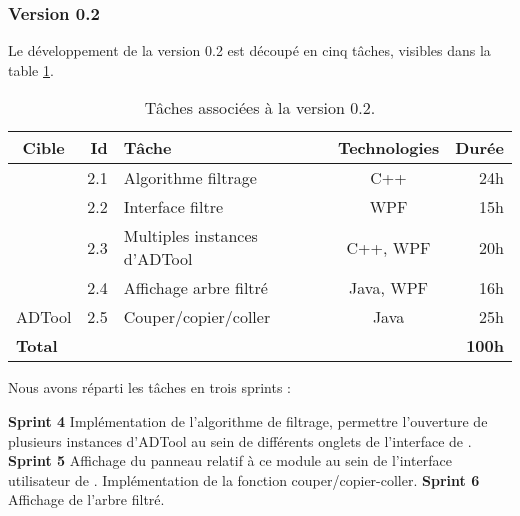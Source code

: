 		\subsubsection{Version 0.2}
			Le développement de la version 0.2 est découpé en cinq tâches, visibles dans la {\sc table} \ref{tab:taches_units_2}.
			\begin{table}[h]
				\centering
				\begin{tabular}{|c|r|l|c|r|}
					\hline
					\textbf{Cible} & \textbf{Id} & \textbf{Tâche} & \textbf{Technologies} & \textbf{Durée}\\
					\hline

					\multirow{4}{*}{\glasir{}} & 2.1 & Algorithme filtrage & C++ & 24h\\
					\cline{2-5}
					 & 2.2 & Interface filtre & WPF & 15h\\
					\cline{2-5}
					 & 2.3 & Multiples instances d'ADTool & C++, WPF & 20h\\
					\cline{2-5}
					 & 2.4 & Affichage arbre filtré & Java, WPF & 16h\\
					\hline

					\multirow{1}{*}{ADTool} & 2.5 & Couper/copier/coller & \multirow{1}{*}{Java} & 25h\\
					\hline

					\multicolumn{4}{|l|}{\bf Total} & {\bf 100h}\\
					\hline
				\end{tabular}
				\caption{Tâches associées à la version 0.2.}
				\label{tab:taches_units_2}
			\end{table}
			
			Nous avons réparti les tâches en trois sprints :

			\noindent\textbf{Sprint 4} Implémentation de l'algorithme de filtrage, permettre l'ouverture de plusieurs instances d'ADTool au sein de différents onglets de l'interface de \glasir{}.\newline 
			\textbf{Sprint 5} Affichage du panneau relatif à ce module au sein de l'interface utilisateur de \glasir{}. Implémentation de la fonction couper/copier-coller.\newline %
			\textbf{Sprint 6} Affichage de l'arbre filtré.

